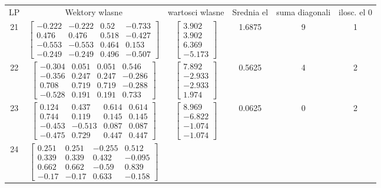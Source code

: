 \documentclass[a4paper,12pt]{article}
\begin{document}
\bgroup {} \vspace{0.2in} \begin{tabular}{c c c c c c}
LP &Wektory wlasne & wartosci wlasne & Srednia el & suma diagonali & ilosc. el 0\\
21
&
$\begin{bmatrix} -0.222 & -0.222 & 0.52 & -0.733 \\ 0.476 & 0.476 & 0.518 & -0.427 \\ -0.553 & -0.553 & 0.464 & 0.153 \\ -0.249 & -0.249 & 0.496 & -0.507 \end{bmatrix}$
&
$\begin{bmatrix} 3.902 \\ 3.902 \\ 6.369 \\ -5.173 \end{bmatrix}$
&
1.6875
&
9
&
1
\\
22
&
$\begin{bmatrix} -0.304 & 0.051 & 0.051 & 0.546 \\ -0.356 & 0.247 & 0.247 & -0.286 \\ 0.708 & 0.719 & 0.719 & -0.288 \\ -0.528 & 0.191 & 0.191 & 0.733 \end{bmatrix}$
&
$\begin{bmatrix} 7.892 \\ -2.933 \\ -2.933 \\ 1.974 \end{bmatrix}$
&
0.5625
&
4
&
2
\\
23
&
$\begin{bmatrix} 0.124 & 0.437 & 0.614 & 0.614 \\ 0.744 & 0.119 & 0.145 & 0.145 \\ -0.453 & -0.513 & 0.087 & 0.087 \\ -0.475 & 0.729 & 0.447 & 0.447 \end{bmatrix}$
&
$\begin{bmatrix} 8.969 \\ -6.822 \\ -1.074 \\ -1.074 \end{bmatrix}$
&
0.0625
&
0
&
2
\\
24
&
$\begin{bmatrix} 0.251 & 0.251 & -0.255 & 0.512 \\ 0.339 & 0.339 & 0.432 & -0.095 \\ 0.662 & 0.662 & -0.59 & 0.839 \\ -0.17 & -0.17 & 0.633 & -0.158 \end{bmatrix}$

\end{tabular}
\end{document}
